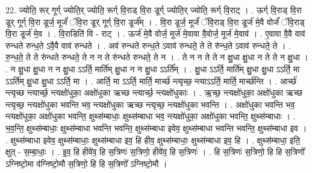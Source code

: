 \documentclass[17pt]{extarticle}
\begin{document}
22. ज्योति॒ रूर् गूर्ग् ज्योति॒र् ज्योति॒ रूर्ग् वि॒राड् वि॒रा डूर्ग् ज्योति॒र् ज्योति॒ रूर्ग् वि॒राट् । . ऊर्ग् वि॒राड् वि॒रा डूर् गूर्ग् वि॒रा डूर्ज॒ मूर्जं॑ ॅवि॒रा डूर् गूर्ग् वि॒रा डूर्ज᳚म् । . वि॒रा डूर्ज॒ मूर्जं॑ ॅवि॒राड् वि॒रा डूर्ज॑ मे॒वै वोर्जं॑ ॅवि॒राड् वि॒रा डूर्ज॑ मे॒व । . वि॒राडिति॑ वि - राट् । . ऊर्ज॑ मे॒वै वोर्ज॒ मूर्ज॑ मे॒वावा वै॒वोर्ज॒ मूर्ज॑ मे॒वाव॑ । . ए॒वावा वै॒वै वाव॑ रुन्धते रुन्ध॒ते ऽवै॒वै वाव॑ रुन्धते । . अव॑ रुन्धते रुन्ध॒ते ऽवाव॑ रुन्धते॒ ते ते रु॑न्ध॒ते ऽवाव॑ रुन्धते॒ ते । . रु॒न्ध॒ते॒ ते ते रु॑न्धते रुन्धते॒ ते न न ते रु॑न्धते रुन्धते॒ ते न । . ते न न ते ते न क्षु॒धा क्षु॒धा न ते ते न क्षु॒धा । . न क्षु॒धा क्षु॒धा न न क्षु॒धा ऽऽर्ति॒ मार्ति॑म् क्षु॒धा न न क्षु॒धा ऽऽर्ति᳚म् । . क्षु॒धा ऽऽर्ति॒ मार्ति॑म् क्षु॒धा क्षु॒धा ऽऽर्ति॒ मा ऽऽर्ति॑म् क्षु॒धा क्षु॒धा ऽऽर्ति॒ मा । . आर्ति॒ मा ऽऽर्ति॒ मार्ति॒ मार्च्छ॑ न्त्यृच्छ॒ न्त्याऽऽर्ति॒ मार्ति॒ मार्च्छ॑न्ति । . आर्च्छ॑ न्त्यृच्छ न्त्यार्च्छ॒ न्त्यक्षो॑धुका॒ अक्षो॑धुका ऋच्छ न्त्यार्च्छ॒ न्त्यक्षो॑धुकाः । . ऋ॒च्छ॒ न्त्यक्षो॑धुका॒ अक्षो॑धुका ऋच्छ न्त्यृच्छ॒ न्त्यक्षो॑धुका भवन्ति भव॒ न्त्यक्षो॑धुका ऋच्छ न्त्यृच्छ॒ न्त्यक्षो॑धुका भवन्ति । . अक्षो॑धुका भवन्ति भव॒ न्त्यक्षो॑धुका॒ अक्षो॑धुका भवन्ति॒ क्षुथ्स॑म्बाधाः॒ क्षुथ्स॑म्बाधा भव॒ न्त्यक्षो॑धुका॒ अक्षो॑धुका भवन्ति॒ क्षुथ्स॑म्बाधाः । . भ॒व॒न्ति॒ क्षुथ्स॑म्बाधाः॒ क्षुथ्स॑म्बाधा भवन्ति भवन्ति॒ क्षुथ्स॑म्बाधा इवेव॒ क्षुथ्स॑म्बाधा भवन्ति भवन्ति॒ क्षुथ्स॑म्बाधा इव । . क्षुथ्स॑म्बाधा इवेव॒ क्षुथ्स॑म्बाधाः॒ क्षुथ्स॑म्बाधा इव॒ हि हीव॒ क्षुथ्स॑म्बाधाः॒ क्षुथ्स॑म्बाधा इव॒ हि । . क्षुथ्स॑म्बाधा॒ इति॒ क्षुत् - स॒म्बा॒धाः॒ । . इ॒व॒ हि हीवे॑व॒ हि स॒त्रिणः॑ स॒त्रिणो॒ हीवे॑व॒ हि स॒त्रिणः॑ । . हि स॒त्रिणः॑ स॒त्रिणो॒ हि हि स॒त्रिणो᳚ ऽग्निष्टो॒मा व॑ग्निष्टो॒मौ स॒त्रिणो॒ हि हि स॒त्रिणो᳚ ऽग्निष्टो॒मौ । \newline
\end{document}
